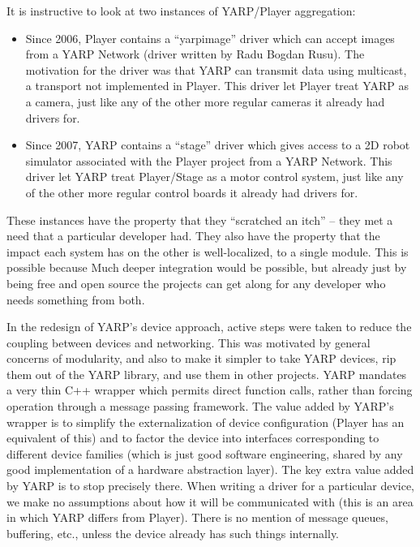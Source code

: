It is instructive to look at two instances of YARP/Player aggregation:

\begin{itemize}

\item
Since 2006, Player contains a ``yarpimage'' driver which can accept
images from a YARP Network (driver written by Radu Bogdan Rusu).
The motivation for the driver was that YARP can transmit
data using multicast, a transport not implemented in Player. 
This driver let Player treat YARP as a camera, just like
any of the other more regular cameras it already had drivers 
for.

\item
Since 2007, YARP contains a ``stage'' driver which gives access to 
a 2D robot simulator associated with the Player project 
from a YARP Network.  This driver let YARP treat Player/Stage as
a motor control system, just like any of the other more regular 
control boards it already had drivers for.

\end{itemize}

These instances have the property that they ``scratched an itch'' --
they met a need that a particular developer had.
They also have the property that the impact each system
has on the other is well-localized, to a single module.
This is possible because
Much deeper integration would be possible, but already
just by being free and open source the projects can get along
for any developer who needs something from both.

In the redesign of YARP's device approach, active steps were
taken to reduce the coupling between devices and networking.
%
This was motivated by general concerns of modularity, and also
to make it simpler to take YARP devices, rip them out
of the YARP library, and use them in other projects.
%
%
%
YARP mandates a very thin C++ wrapper which permits direct function
calls, rather than forcing operation through a message passing
framework.  The value added by YARP's wrapper is to simplify the
externalization of device configuration (Player has an equivalent of
this) and to factor the device into interfaces corresponding to
different device families (which is just good software engineering,
shared by any good implementation of a hardware abstraction layer).
%
The key extra value added by YARP is to stop precisely there.
%
When writing a driver for a particular device, we make no assumptions
about how it will be communicated with (this is an area in which YARP
differs from Player).  There is no mention of message queues, 
buffering, etc., unless the device already has such things internally.


